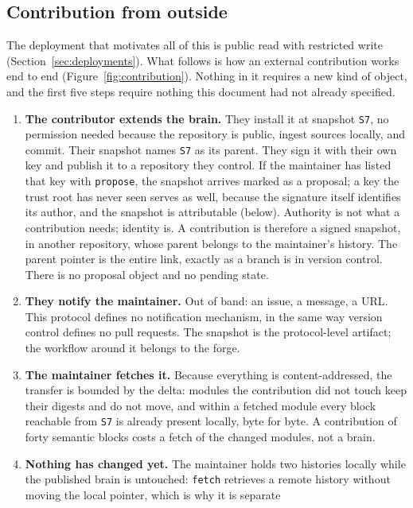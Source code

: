 \documentclass[11pt,a4paper]{article}
\begin{document}
\subsection{Contribution from outside}
\label{sec:contribution}

The deployment that motivates all of this is public read with restricted write
(Section~\ref{sec:deployments}). What follows is how an external contribution
works end to end (Figure~\ref{fig:contribution}). Nothing in it requires a new
kind of object, and the first five steps require nothing this document had not
already specified.

\begin{enumerate}[leftmargin=1.6em]
  \item \textbf{The contributor extends the brain.} They install it at snapshot
  \texttt{S7}, no permission needed because the repository is public, ingest
  sources locally, and commit. Their snapshot names \texttt{S7} as its parent.
  They sign it with their own key and publish it to a repository they control.
If the maintainer has listed that key with \texttt{propose}, the snapshot
arrives marked as a proposal; a key the trust root has never seen serves as
well, because the signature itself identifies its author, and the snapshot is
attributable (below). Authority is not what a contribution needs; identity is.
A contribution is therefore a signed snapshot, in another repository, whose
parent belongs to the maintainer's history. The
  parent pointer is the entire link, exactly as a branch is in version control.
  There is no proposal object and no pending state.
  \item \textbf{They notify the maintainer.} Out of band: an issue, a message, a
  URL. This protocol defines no notification mechanism, in the same way version
  control defines no pull requests. The snapshot is the protocol-level artifact;
  the workflow around it belongs to the forge.
  \item \textbf{The maintainer fetches it.} Because everything is content-addressed, the transfer is bounded by the delta:
modules the contribution did not touch keep their digests and do not move, and
within a fetched module every block reachable from \texttt{S7} is already
present locally, byte for byte. A contribution of forty semantic blocks costs
a fetch of the changed modules, not a brain.
  \item \textbf{Nothing has changed yet.} The maintainer holds two histories
locally while the published brain is untouched: \texttt{fetch} retrieves a
remote history without moving the local pointer, which is why it is separate

\end{enumerate}
\end{document}
